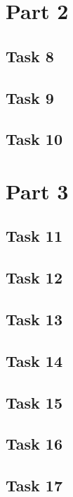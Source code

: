 \documentclass[11pt, a4paper]{article}
\begin{document}
\section{Part 2}

\subsection{Task 8}

\subsection{Task 9}

\subsection{Task 10}

\section{Part 3}

\subsection{Task 11}

\subsection{Task 12}

\subsection{Task 13}

\subsection{Task 14}

\subsection{Task 15}

\subsection{Task 16}

\subsection{Task 17}
\end{document}
